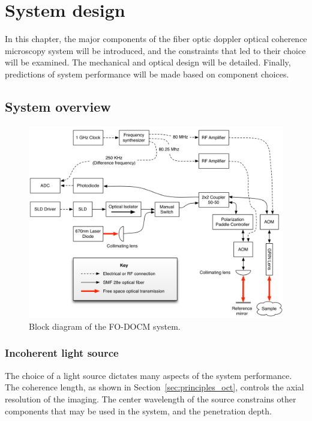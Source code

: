 
\chapter{System design}

In this chapter, the major components of the fiber optic doppler optical coherence microscopy system will be introduced, and the constraints that led to their choice will be examined. The mechanical and optical design will be detailed. Finally, predictions of system performance will be made based on component choices.

\section{System overview}

\begin{figure}[h!]
\centering
\includegraphics[width=1.0\textwidth]{Images/Background/actual_system_vertical.png}
\caption{Block diagram of the FO-DOCM system.}
\end{figure}

\subsection{Incoherent light source}

The choice of a light source dictates many aspects of the system performance. The coherence length, as shown in Section~\ref{sec:principles_oct}, controls the axial resolution of the imaging. The center wavelength of the source constrains other components that may be used in the system, and the penetration depth.

